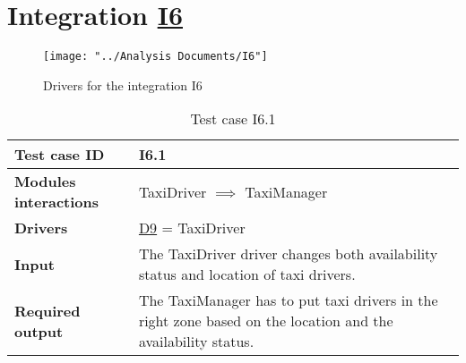 \section{Integration \hyperref[I6]{I6} \label{int_I6}}
\begin{figure}[H]
\centering
\texttt{[image: "../Analysis Documents/I6"]}
\caption{Drivers for the integration I6}
\end{figure}

\begin{table}[H]
	\begin{tabular}{ l | p{} }
		\textbf{Test case ID} & I6.1 \\ \hline
		\textbf{Modules interactions} & TaxiDriver $\implies$ TaxiManager \\ \hline
		\textbf{Drivers} &  \hyperref[D9]{D9} = TaxiDriver \\ \hline
		\textbf{Input} &  The TaxiDriver driver changes both availability status and location of taxi drivers.\\ \hline
		\textbf{Required output} & The TaxiManager has to put taxi drivers in the right zone based on the location and the availability status.
	\end{tabular}
	\caption{Test case I6.1}
\end{table}